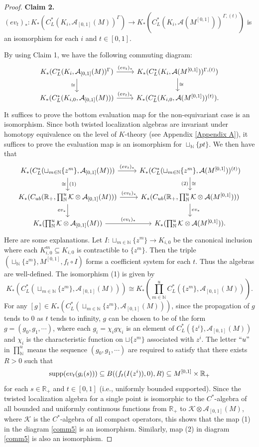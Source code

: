 \documentclass[11pt]{article}
\theoremstyle{definition}
\theoremstyle{plain}
\def\IN{\mathbb N}\def\IR{\mathbb R}\def\IE{\mathbb E}\def\IC{\mathbb C}\def\IL{\mathbb L}\def\IQ{\mathbb Q}\def\IA{\mathbb A}\def\IZ{\mathbb Z}
\def\A{\mathcal A}\def\C{\mathcal C}\def\B{\mathcal B}\def\E{\mathcal E}\def\O{\mathcal O}\def\h{\mathfrak h}\def\K{\mathcal K}\def\F{\mathcal F}\def\P{\mathcal P}\def\L{\mathcal L}\def\R{\mathcal R}\def\Q{\mathcal Q}\def\H{\mathcal H}\def\S{\mathcal S}\def\N{\mathcal N}\def\U{\mathcal U}\def\V{\mathcal V}
\def\supp{\textup{supp}}
\def\ox{\otimes}
\def\ox{\otimes}
\def\Ga{\Gamma}
\begin{document}
\begin{proof}
{\bf Claim 2.} $(ev_t)_*:K_*(C^*_L(K_i,\A_{[0,1]}(M))^{\Ga})\to K_*(C^*_L(K_{i},\A(M^{[0,1]}))^{\Ga,(t)})$ is an isomorphism for each $i$ and $t\in[0,1]$.

By using Claim 1, we have the following commuting diagram:
\[\begin{tikzcd}
K_*(C^*_L(K_i,\A_{[0,1]}(M))^{\Ga}) \arrow[r, "(ev_t)_*"] \arrow[d, "\cong"'] & K_*(C^*_L(K_i,\A(M^{[0,1]}))^{\Ga,(t)}) \arrow[d, "\cong"] \\
K_*(C^*_L(K_{i,0},\A_{[0,1]}(M))) \arrow[r, "(ev_t)_*"]                     & K_*(C^*_L(K_{i,0},\A(M^{[0,1]}))^{(t)}).                   
\end{tikzcd}\]
It suffices to prove the bottom evaluation map for the non-equivariant case is an isomorphism. Since both twisted localization algebras are invariant under homotopy equivalence on the level of $K$-theory (see Appendix \ref{Appendix A}), it suffices to prove the evaluation map is an isomorphism for $\sqcup_{\IN}\{pt\}$. We then have that
\begin{equation}\label{comm5}\begin{tikzcd}
K_*(C^*_L(\sqcup_{m\in\IN}\{z^m\},\A_{[0,1]}(M))) \arrow[r, "(ev_t)_*"] \arrow[d, "(1)","\cong"'] & K_*(C^*_L(\sqcup_{m\in\IN}\{z^m\},\A(M^{[0,1]}))^{(t)}) \arrow[d, "\cong","(2)"'] \\
K_*(C_{ub}(\IR_+,\prod^u_{\IN}\K\ox\A_{[0,1]}(M))) \arrow[r, "(ev_t)_*"] \arrow[d, "ev_*"']  & K_*(C_{ub}(\IR_+,\prod^u_{\IN}\K\ox\A(M^{[0,1]}))) \arrow[d, "ev_*"]  \\
K_*(\prod^u_{\IN}\K\ox\A_{[0,1]}(M)) \arrow[r, "(ev_t)_*"]                     & K_*(\prod^u_{\IN}\K\ox\A(M^{[0,1]})).                  
\end{tikzcd}\end{equation}
Here are some explanations. Let $I:\sqcup_{m\in\IN}\{z^m\}\to K_{i,0}$ be the canonical inclusion where each $K_{i,0}^m\subseteq K_{i,0}$ is contractible to $\{z^m\}$. Then the triple $(\sqcup_{\IN}\{z^m\},M^{[0,1]},f_t\circ I)$ forms a coefficient system for each $t$. Thus the algebras are well-defined. The isomorphism (1) is given by
\[K_*(C^*_L(\sqcup_{m\in\IN}\{z^m\},\A_{[0,1]}(M)))\cong K_*\left(\prod_{m\in\IN}^uC^*_L(\{z^m\},\A_{[0,1]}(M))\right).\]
For any $[g]\in K_*(C^*_L(\sqcup_{m\in\IN}\{z^m\},\A_{[0,1]}(M)))$, since the propagation of $g$ tends to $0$ as $t$ tends to infinity, $g$ can be chosen to be of the form $g=(g_0,g_1,\cdots)$, where each $g_i=\chi_i g\chi_i$ is an element of $C^*_L(\{z^i\},\A_{[0,1]}(M))$ and $\chi_i$ is the characteristic function on $\sqcup\{z^m\}$ associated with $z^i$. The letter $``u"$ in $\prod_{\IN}^u$ means the sequence $(g_0,g_1,\cdots)$ are required to satisfy that there exists $R>0$ such that
$$\supp(ev_t(g_i(s)))\subseteq B((f_t(I(z^i)),0),R)\subseteq M^{[0,1]}\times\IR_+$$
for each $s\in\IR_+$ and $t\in[0,1]$ (i.e., uniformly bounded supported). Since the twisted localization algebra for a single point is isomorphic to the $C^*$-algebra of all bounded and uniformly continuous functions from $\IR_+$ to $\K\ox\A_{[0,1]}(M)$, where $\K$ is the $C^*$-algebra of all compact operators, this shows that the map (1) in the diagram \eqref{comm5} is an isomorphism. Similarly, map (2) in diagram \eqref{comm5} is also an isomorphism.


\end{proof}
\end{document}
